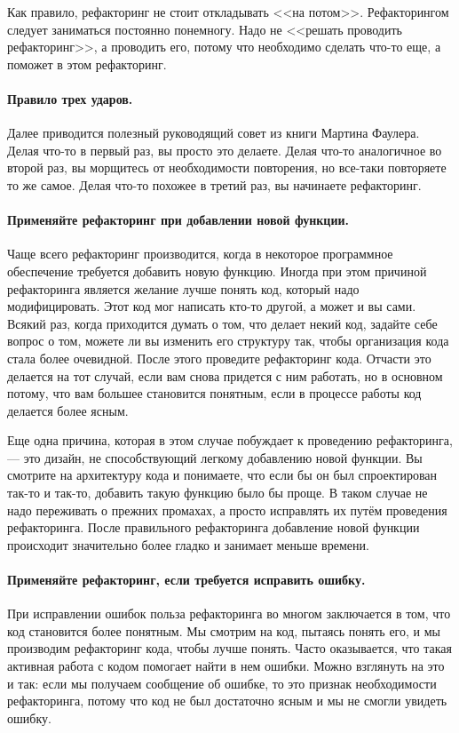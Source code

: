 \documentclass{../../text-style}
\begin{document}
Как правило, рефакторинг не стоит откладывать <<на потом>>. Рефакторингом следует заниматься постоянно понемногу. Надо не <<решать проводить рефакторинг>>, а проводить его, потому что необходимо сделать что-то еще, а поможет в этом рефакторинг.

\paragraph{Правило трех ударов.} Далее приводится полезный руководящий совет из книги Мартина Фаулера. Делая что-то в первый раз, вы просто это делаете. Делая что-то аналогичное во второй раз, вы морщитесь от необходимости повторения, но все-таки повторяете то же самое. Делая что-то похожее в третий раз, вы начинаете рефакторинг.

\paragraph{Применяйте рефакторинг при добавлении новой функции.} Чаще всего рефакторинг производится, когда в некоторое программное обеспечение требуется добавить новую функцию. Иногда при этом причиной рефакторинга является желание лучше понять код, который надо модифицировать. Этот код мог написать кто-то другой, а может и вы сами. Всякий раз, когда приходится думать о том, что делает некий код, задайте себе вопрос о том, можете ли вы изменить его структуру так, чтобы организация кода стала более очевидной. После этого проведите рефакторинг кода. Отчасти это делается на тот случай, если вам снова придется с ним работать, но в основном потому, что вам большее становится понятным, если в процессе работы код делается более ясным.

Еще одна причина, которая в этом случае побуждает к проведению рефакторинга, --- это дизайн, не способствующий легкому добавлению новой функции. Вы смотрите на архитектуру кода и понимаете, что если бы он был спроектирован так-то и так-то, добавить такую функцию было бы проще. В таком случае не надо переживать о прежних промахах, а просто исправлять их путём проведения рефакторинга. После правильного рефакторинга добавление новой функции происходит значительно более гладко и занимает меньше времени.

\paragraph{Применяйте рефакторинг, если требуется исправить ошибку.} При исправлении ошибок польза рефакторинга во многом заключается в том, что код становится более понятным. Мы смотрим на код, пытаясь понять его, и мы производим рефакторинг кода, чтобы лучше понять. Часто оказывается, что такая активная работа с кодом помогает найти в нем ошибки. Можно взглянуть на это и так: если мы получаем сообщение об ошибке, то это признак необходимости рефакторинга, потому что код не был достаточно ясным и мы не смогли увидеть ошибку.
\end{document}

